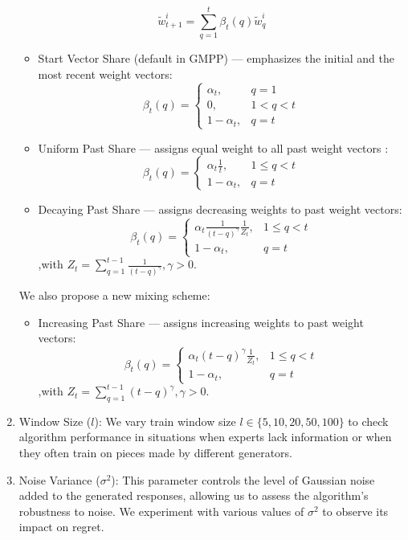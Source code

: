 \documentclass[12pt, twoside]{article}
\begin{document}
\begin{enumerate}
\[ \widetilde{w}_{t+1}^i = \sum_{q=1}^t\beta_t(q)\widetilde{w}_q^i  \]

\begin{itemize}
\item Start Vector Share (default in GMPP) --- emphasizes the initial and the most recent  weight  vectors:
    \[\beta_t(q) =
    \begin{cases}
    \alpha_t, & q = 1 \\
    0, & 1 < q < t \\
    1 - \alpha_t, & q = t 
    \end{cases}\]
    
\item Uniform Past Share ---  assigns equal weight to all past weight vectors : 
    \[\beta_t(q) =
    \begin{cases}
    \alpha_t\frac{1}{t}, & 1 \le q < t \\
    1 - \alpha_t, & q = t 
    \end{cases}\]
    
\item Decaying Past Share ---  assigns decreasing weights to past weight vectors:
    \[\beta_t(q) =
    \begin{cases}
    \alpha_t\frac{1}{(t-q)^\gamma}\frac{1}{Z_t}, & 1 \le q < t \\
    1 - \alpha_t, & q = t
    \end{cases}\]
    \hfill ,with $Z_t = \sum_{q=1}^{t-1} \frac{1}{(t-q)^\gamma}, \gamma > 0$. 
        
\end{itemize}

We also propose a new mixing scheme:
\begin{itemize}

\item Increasing Past Share --- assigns increasing weights to past weight vectors:
    \[\beta_t(q) =
    \begin{cases}
    \alpha_t(t-q)^\gamma\frac{1}{Z_t}, & 1 \le q < t \\
    1 - \alpha_t, & q = t
    \end{cases}\]
    \hfill ,with $Z_t = \sum_{q=1}^{t-1}(t-q)^\gamma, \gamma > 0$. 
        
\end{itemize}


\item Window Size ($l$): We vary train window size $l \in \{5, 10, 20, 50, 100\}$ to check algorithm performance in situations when experts lack information or when they often train on pieces made by different generators.

\item Noise Variance ($\sigma^2$): This parameter controls the level of Gaussian noise added to the generated responses, allowing us to assess the algorithm's robustness to noise. We experiment with various values of $\sigma^2$ to observe its impact on regret.
\end{enumerate}
%
%
\end{document}
